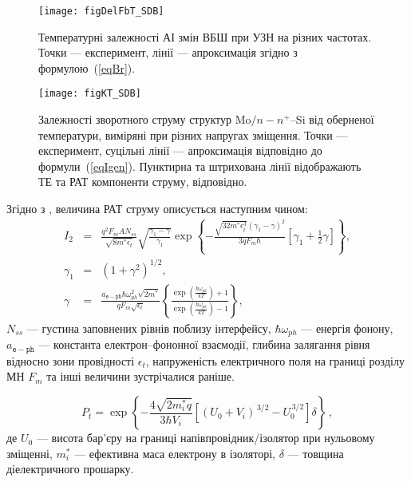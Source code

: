 \documentclass[a5paper,10pt,twoside,openany,article]{memoir} %
\begin{document}
\begin{figure}
\center
\texttt{[image: figDelFbT\_SDB]}
\caption{\label{figDelFbT_SDB}
Температурні залежності АІ змін ВБШ при УЗН на різних частотах.
Точки --- експеримент,
лінії --- апроксимація згідно з формулою~(\ref{eqBr}).
}%
\end{figure}


\begin{figure}
\center
\texttt{[image: figKT\_SDB]}
\caption{\label{figKT_SDB}
Залежності зворотного струму структур Mo$/n-n^+$--Si від оберненої температури,
виміряні при різних напругах зміщення.
Точки --- експеримент,
суцільні лінії --- апроксимація відповідно до формули~(\ref{eqIgen}).
Пунктирна та штрихована лінії відображають ТЕ та РАТ компоненти струму, відповідно.
}%
\end{figure}

Згідно з \cite{Pipinys2006}, величина РАТ струму описується наступним чином:
\begin{eqnarray}
\label{eqIpat}
 I_{2}&=&\frac{q^2F_mAN_{ss}}{\sqrt{8m^*\epsilon_t}}\sqrt{\frac{\gamma_1-\gamma}{\gamma_1}}\exp
    \left\{-\frac{\sqrt{32m^*\epsilon_t^3}\left(\gamma_1-\gamma\right)^2}{3qF_m\hbar}
    [\gamma_1+\frac{1}{2}\gamma]\right\}, \\
    \gamma_1&=&(1+\gamma^2)^{1/2},\\
\label{eqIpat3}
    \gamma&=&\frac{a_\mathtt{e-ph}\hbar\omega_{ph}^2\sqrt{2m^*}}{qF_m\sqrt{\epsilon_t}}
    \left\{\frac{\exp\left(\frac{\hbar\omega_{ph}}{kT}\right)+1}{\exp\left(\frac{\hbar\omega_{ph}}{kT}\right)-1}\right\},
\end{eqnarray}
$N_{ss}$ --- густина заповнених рівнів поблизу інтерфейсу,
$\hbar\omega_{ph}$ --- енергія фонону,
$a_\mathtt{e-ph}$ --- константа електрон--фононної взаємодії,
глибина залягання рівня відносно зони провідності $\epsilon_t$,
напруженість електричного поля на границі розділу МН $F_m$ та інші величини зустрічалися раніше.

\begin{equation}\label{eqPt}
    P_t=\exp\left\{-\frac{4\sqrt{2m_i^*q}}{3\hbar V_i}\left[(U_0+V_i)^{\,3/2}-U_0^{\,3/2}\right]\delta\right\}\,,
\end{equation}
де
$U_0$ --- висота бар'єру на границі напівпровідник/ізолятор при нульовому зміщенні,
$m_i^*$ --- ефективна маса електрону в ізоляторі,
$\delta$ --- товщина діелектричного прошарку.
\end{document}
